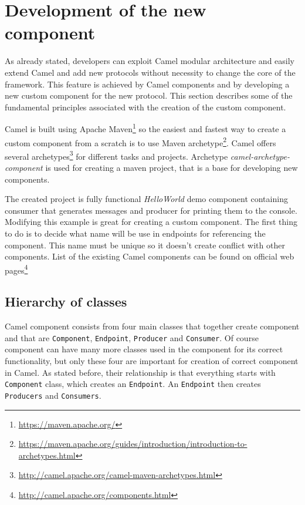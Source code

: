 \documentclass[12pt,final,oneside]{fithesis2}
\begin{document}
 
\section{Development of the new component}\label{component-devel}
As already stated, developers can exploit Camel modular architecture and easily extend Camel and add new protocols without necessity to change the core of the framework. This feature is achieved by Camel components and by developing a new custom component for the new protocol. This section describes some of the fundamental principles associated with the creation of the custom component.

Camel is built using Apache Maven\footnote{\url{https://maven.apache.org/}} so the easiest and fastest way to create a custom component from a scratch is to use Maven archetype\footnote{\url{https://maven.apache.org/guides/introduction/introduction-to-archetypes.html}}. Camel offers several archetypes\footnote{\url{http://camel.apache.org/camel-maven-archetypes.html}} for different tasks and projects. Archetype \textit{camel-archetype-component} is used for creating a maven project, that is a base for developing new components\cite{camel-comp}. 

The created project is fully functional \textit{HelloWorld} demo component containing consumer that generates messages and producer for printing them to the console. Modifying this example is great for creating a custom component. The first thing to do is to decide what name will be use in endpoints for referencing the component. This name must be unique so it doesn't create conflict with other components. List of the existing Camel components can be found on official web pages\footnote{\url{http://camel.apache.org/components.html}}

\subsection{Hierarchy of classes}
Camel component consists from four main classes that together create component and that are \texttt{Component}, \texttt{Endpoint}, \texttt{Producer} and \texttt{Consumer}. Of course component can have many more classes used in the component for its correct functionality, but only these four are important for creation of correct component in Camel. As stated before, their relationship is that everything starts with \texttt{Component} class, which creates an \texttt{Endpoint}. An \texttt{Endpoint} then creates \texttt{Producers} and \texttt{Consumers}.
\end{document}
